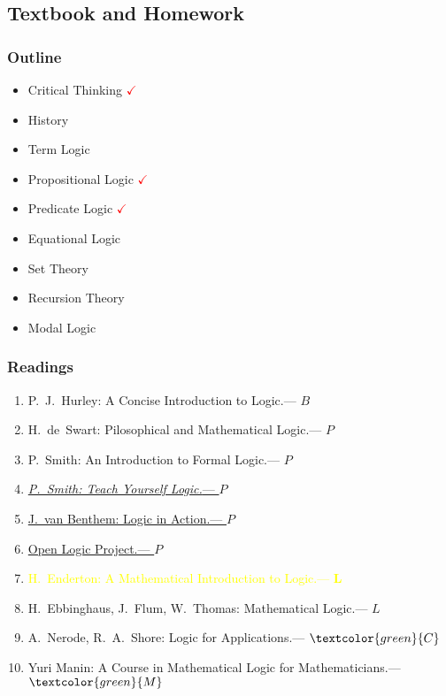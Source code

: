 \documentclass[UTF8,aspectratio=43,11pt,colorlinks,compress,openany]{beamer}%
\begin{document}
\subsection{Textbook and Homework}

\begin{frame}\frametitle{Outline}
	\begin{itemize}
		\item Critical Thinking \textcolor{red}{$\checkmark$}
		\item History
		\item Term Logic
		\item Propositional Logic \textcolor{red}{$\checkmark$}
		\item Predicate Logic \textcolor{red}{$\checkmark$}
		\item Equational Logic
		\item Set Theory
		\item Recursion Theory
		\item Modal Logic
	\end{itemize}
\end{frame}

\begin{frame}\frametitle{Readings}
		\begin{enumerate}
			\item P.~J.~Hurley: A Concise Introduction to Logic.\hfill --- $B$
			\item H.~de~Swart: Pilosophical and Mathematical Logic.\hfill --- $P$
			\item P.~Smith: An Introduction to Formal Logic.\hfill --- $P$
			\item \href{http://www.logicmatters.net/tyl}{\emph{P.~Smith: Teach Yourself Logic.}\hfill --- $P$}
			\item \href{http://www.logicinaction.org}{J.~van Benthem: Logic in Action.\hfill --- $P$}
			\item \href{http://builds.openlogicproject.org}{Open Logic Project.\hfill --- $P$}
			\item \textcolor{yellow}{H.~Enderton: A Mathematical Introduction to Logic.\hfill --- $\textbf{L}$}
			\item H.~Ebbinghaus, J.~Flum, W.~Thomas: Mathematical Logic.\hfill --- $L$
			\item A.~Nerode, R.~A.~Shore: Logic for Applications.\hfill --- $\textcolor{green}{C}$
			\item Yuri Manin: A Course in Mathematical Logic for Mathematicians.\hfill --- $\textcolor{green}{M}$
		\end{enumerate}
\end{frame}
\end{document}
